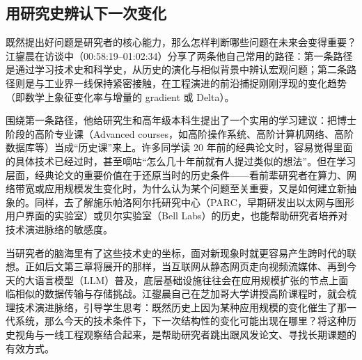 \documentclass[UTF8,a4paper,11pt,fontset=fandol]{ctexart}
\begin{document}
\subsection{用研究史辨认下一次变化}
既然提出好问题是研究者的核心能力，那么怎样判断哪些问题在未来会变得重要？江鋆晨在访谈中（00:58:19–01:02:34）分享了两条他自己常用的路径：第一条路径是通过学习技术史和科学史，从历史的演化与相似背景中辨认宏观问题；第二条路径则是与工业界一线保持紧密接触，在工程演进的前沿捕捉刚刚浮现的变化趋势（即数学上象征变化率与增量的 gradient 或 Delta）。

围绕第一条路径，他给研究生和高年级本科生提出了一个实用的学习建议：把博士阶段的高阶专业课（Advanced courses，如高阶操作系统、高阶计算机网络、高阶数据库等）当成“历史课”来上。许多同学读 20 年前的经典论文时，容易觉得里面的具体技术已经过时，甚至嘀咕“怎么几十年前就有人提过类似的想法”。但在学习层面，经典论文的重要价值在于还原当时的历史条件——看前辈研究者在算力、网络带宽或应用规模发生变化时，为什么认为某个问题至关重要，又是如何建立新抽象的。同样，去了解施乐帕洛阿尔托研究中心（PARC，早期研发出以太网与图形用户界面的实验室）或贝尔实验室（Bell Labs）的历史，也能帮助研究者培养对技术演进脉络的敏感度。

当研究者的脑海里有了这些技术史的坐标，面对新现象时就更容易产生跨时代的联想。正如后文第三章将展开的那样，当互联网从静态网页走向视频流媒体、再到今天的大语言模型（LLM）普及，底层基础设施往往会在应用规模扩张的节点上面临相似的数据传输与存储挑战。江鋆晨自己在芝加哥大学讲授高阶课程时，就会梳理技术演进脉络，引导学生思考：既然历史上因为某种应用规模的变化催生了那一代系统，那么今天的技术条件下，下一次结构性的变化可能出现在哪里？将这种历史视角与一线工程观察结合起来，是帮助研究者跳出跟风发论文、寻找长期课题的有效方式。
\end{document}
